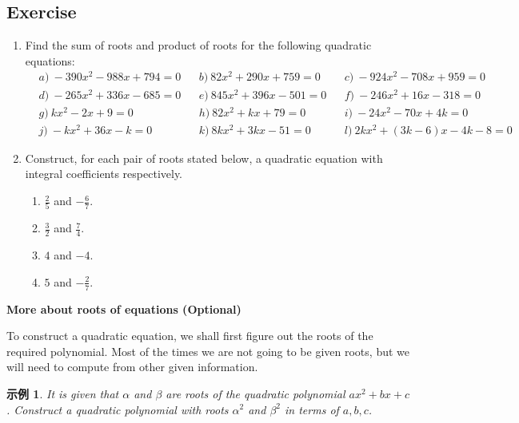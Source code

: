 \documentclass[12pt]{article}
\newtheorem{example}{示例}
\begin{document}
    \subsection*{Exercise}
    \begin{enumerate}
        \item Find the sum of roots and product of roots for the following quadratic equations:\begin{align*}
            &a)\ -390x^2-988x+794=0&&b)\ 82x^2+290x+759=0&&c)\ -924x^2-708x+959=0\\
            &d)\ -265x^2+336x-685=0&&e)\ 845x^2+396x-501=0&&f)\ -246x^2+16x-318=0\\
            &g)\ kx^2-2x+9=0&&h)\ 82x^2+kx+79=0&&i)\ -24x^2-70x+4k=0\\
            &j)\ -kx^2+36x-k=0&&k)\ 8kx^2+3kx-51=0&&l)\ 2kx^2+(3k-6)x-4k-8=0
        \end{align*}
        \item Construct, for each pair of roots stated below, a quadratic equation with integral coefficients respectively.\begin{enumerate}
            \item $\frac{2}{5}$ and $-\frac{6}{7}$.
            \item $\frac{3}{2}$ and $\frac{7}{4}$.
            \item $4$ and $-4$.
            \item $5$ and $-\frac{2}{7}$.
        \end{enumerate}
    \end{enumerate}

    \begin{center}
        \textbf{More about roots of equations (Optional)}
    \end{center}

    To construct a quadratic equation, we shall first figure out the roots of the required polynomial. Most of the times we are not going to be given roots, but we will need to compute from other given information.

    \begin{example}
        It is given that $\alpha$ and $\beta$ are roots of the quadratic polynomial $ax^2+bx+c$. Construct a quadratic polynomial with roots $\alpha^2$ and $\beta^2$ in terms of $a,b,c$.
    \end{example}
\end{document}
